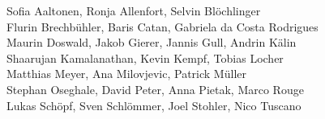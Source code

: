 %
%
%
Sofia Aaltonen,		%
Ronja Allenfort,	%
Selvin Blöchlinger%
\\
Flurin Brechbühler,	%
Baris Catan,		%
Gabriela da Costa Rodrigues%
\\
Maurin Doswald,		%
Jakob Gierer,		%
Jannis Gull,		%
Andrin Kälin%
\\
Shaarujan Kamalanathan,	%
Kevin Kempf,		%
Tobias Locher%
\\
Matthias Meyer,		%
Ana Milovjevic,		%
Patrick Müller%
\\
Stephan Oseghale,	%
David Peter,		%
Anna Pietak,		%
Marco Rouge%
\\
Lukas Schöpf,		%
Sven Schlömmer,		%
Joel Stohler,		%
Nico Tuscano%
